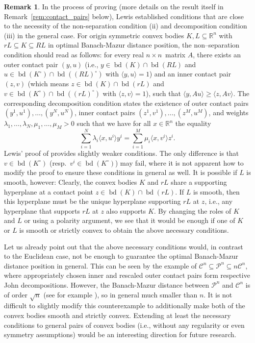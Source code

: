 \documentclass[12pt,a4paper]{article}
\theoremstyle{definition}
\newtheorem{remark}[twr]{Remark}
\DeclareMathOperator{\bd}{bd}
\newcommand\R{\mathbb{R}}
\newcommand\CC{\mathcal{C}}
\newcommand\CP{\mathcal{P}}
\begin{document}
\begin{remark}
\label{rem:general}
In the process of proving \cite[Theorem~$2.1$]{lewis} (more details on the result itself in Remark~\ref{rem:contact_pairs} below), Lewis established conditions that are close to the necessity of the non-separation condition (ii) and decomposition condition (iii) in the general case. For origin symmetric convex bodies $K,L \subseteq \R^n$ with $r L \subseteq K \subseteq R L$ in optimal Banach-Mazur distance position, the non--separation condition should read as follows: for every real $n \times n$~matrix $A$, there exists an outer contact pair $(y, u)$ (i.e., $y \in \bd(K) \cap \bd(RL)$ and $u \in \bd(K^{\circ}) \cap \bd((RL)^{\circ})$ with $\langle y, u \rangle = 1$) and an inner contact pair $(z, v)$ (which means $z \in \bd(K) \cap \bd(rL)$ and $v \in \bd(K^{\circ}) \cap \bd((rL)^{\circ})$ with $\langle z, v \rangle = 1$), such that $\langle y, Au \rangle \geq \langle z, Av \rangle$. The corresponding decomposition condition states the existence of outer contact pairs $(y^1,u^1), \ldots, (y^N,u^N)$, inner contact pairs $(z^1,v^1), \ldots, (z^M,u^M)$, and weights $\lambda_1, \ldots, \lambda_N, \mu_1, \ldots, \mu_M > 0$ such that we have for all $x \in \R^n$ the equality
$$ \sum_{i=1}^N \lambda_i \langle x, u^i \rangle y^i = \sum_{i=1}^M \mu_i \langle x, v^i \rangle z^i. $$
Lewis' proof of \cite[Theorem~$2.1$]{lewis} provides slightly weaker conditions. The only difference is that $v \in \bd(K^{\circ})$ (resp.~$v^i \in \bd(K^\circ)$) may fail, where it is not apparent how to modify the proof to ensure these conditions in general as well. It is possible if $L$ is smooth, however: Clearly, the convex bodies $K$ and $rL$ share a supporting hyperplane at a contact point $z \in \bd(K) \cap \bd(rL)$. If $L$ is smooth, then this hyperplane must be the unique hyperplane supporting $r L$ at $z$, i.e., any hyperplane that supports $rL$ at $z$ also supports $K$. By changing the roles of $K$ and $L$ or using a polarity argument, we see that it would be enough if one of $K$ or $L$ is smooth or strictly convex to obtain the above necessary conditions.
\newpage

Let us already point out that the above necessary conditions would, in contrast to the Euclidean case, not be enough to guarantee the optimal Banach-Mazur distance position in general. This can be seen by the example of $\CC^n \subseteq \CP^n \subseteq n\CC^n$, where appropriately chosen inner and rescaled outer contact pairs form respective John decompositions. However, the Banach-Mazur distance between $\CP^n$ and $\CC^n$ is of order $\sqrt{n}$ (see for example \cite[Proposition~$37.6$]{tomczak}), so in general much smaller than $n$. It is not difficult to slightly modify this counterexample to additionally make both of the convex bodies smooth and strictly convex. Extending at least the necessary conditions to general pairs of convex bodies (i.e., without any regularity or even symmetry assumptions) would be an interesting direction for future research.
\end{remark}
\end{document}

